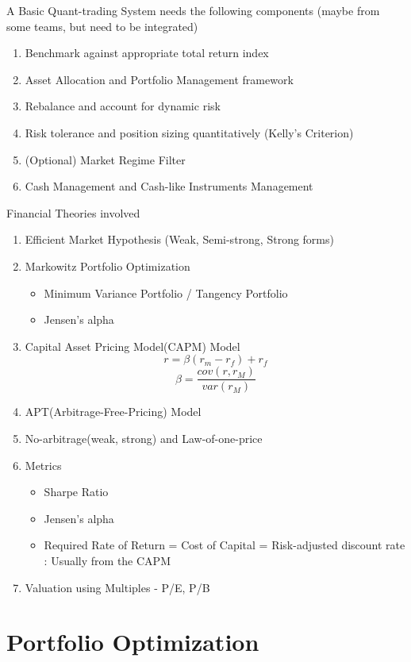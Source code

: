 \documentclass[11pt, openany]{book}              %
\begin{document}
A Basic Quant-trading System needs the following components (maybe from some teams, but need to be integrated)

\begin{enumerate}
\item Benchmark against appropriate total return index
\item Asset Allocation and Portfolio Management	framework
\item Rebalance and account for dynamic risk 
\item Risk tolerance and position sizing quantitatively (Kelly's Criterion)
\item (Optional) Market Regime Filter 
\item Cash Management and Cash-like Instruments Management
\end{enumerate}

Financial Theories involved

\begin{enumerate}
 \item Efficient Market Hypothesis (Weak, Semi-strong, Strong forms)
 \item Markowitz Portfolio Optimization
 \begin{itemize}
    \item Minimum Variance Portfolio / Tangency Portfolio 
    \item Jensen's alpha
  \end{itemize}
  \item Capital Asset Pricing Model(CAPM) Model \\
        $$ r = \beta(r_m - r_f) + r_f $$
 		$$\beta = \frac{cov(r,r_M)}{var(r_M)}$$
  \item APT(Arbitrage-Free-Pricing) Model 
 \item No-arbitrage(weak, strong) and Law-of-one-price
 \item Metrics
  \begin{itemize}
    \item Sharpe Ratio
    \item Jensen's alpha
    
        \item Required Rate of Return = Cost of Capital = Risk-adjusted discount rate : Usually from the CAPM
   \end{itemize}
 \item Valuation using Multiples - P/E, P/B 
 \end{enumerate}
 
 
\section{Portfolio Optimization}
\end{document}
